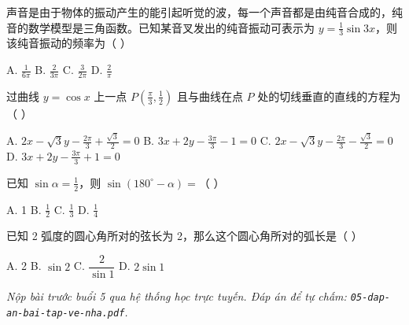 \documentclass[11pt, a4paper]{article}
\begin{document}
\begin{baitap}[12]
声音是由于物体的振动产生的能引起听觉的波，每一个声音都是由纯音合成的，纯音的数学模型是三角函数。已知某音叉发出的纯音振动可表示为 $y=\frac{1}{3}\sin3x$，则该纯音振动的频率为（ ）
\par\vspace{3pt}
\noindent A. $\frac{1}{6\pi}$ \quad B. $\frac{2}{3\pi}$ \quad C. $\frac{3}{2\pi}$ \quad D. $\frac{2}{\pi}$
\end{baitap}

\begin{baitap}[13]
过曲线 $y=\cos x$ 上一点 $P\left(\frac{\pi}{3},\frac{1}{2}\right)$ 且与曲线在点 $P$ 处的切线垂直的直线的方程为（ ）
\par\vspace{3pt}
\noindent A. $2x-\sqrt{3}y-\frac{2\pi}{3}+\frac{\sqrt{3}}{2}=0$ \quad B. $3x+2y-\frac{3\pi}{3}-1=0$ \quad C. $2x-\sqrt{3}y-\frac{2\pi}{3}-\frac{\sqrt{3}}{2}=0$ \quad D. $3x+2y-\frac{3\pi}{3}+1=0$
\end{baitap}

\begin{baitap}[14]
已知 $\sin\alpha = \frac{1}{2}$，则 $\sin(180^\circ - \alpha) =$（ ）
\par\vspace{3pt}
\noindent A. 1 \quad B. $\frac{1}{2}$ \quad C. $\frac{1}{3}$ \quad D. $\frac{1}{4}$
\end{baitap}

\begin{baitap}[15]
已知 2 弧度的圆心角所对的弦长为 2，那么这个圆心角所对的弧长是（ ）
\par\vspace{3pt}
\noindent A. 2 \quad B. $\sin 2$ \quad C. $\dfrac{2}{\sin 1}$ \quad D. $2\sin 1$
\end{baitap}

\vspace{0.3cm}
\noindent\emph{Nộp bài trước buổi 5 qua hệ thống học trực tuyến. Đáp án để tự chấm: \texttt{05-dap-an-bai-tap-ve-nha.pdf}.}
\end{document}
